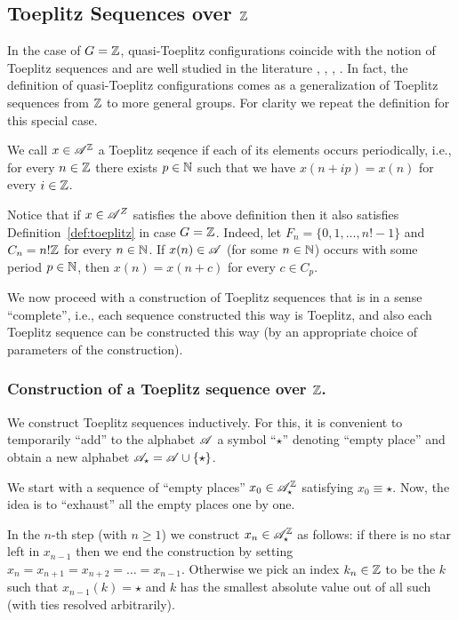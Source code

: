 \subsection{Toeplitz Sequences over $\mathbb{Z}$}
In the case of $G=\mathbb{Z}$, quasi-Toeplitz configurations coincide with the notion of Toeplitz sequences and are well studied in the literature \cite{JK69}, \cite{DI88}, \cite{AKL16}, \cite{Downarowicz05}.
%
In fact, the definition of quasi-Toeplitz configurations comes as a generalization of Toeplitz sequences from $\mathbb{Z}$ to more general groups.
%
For clarity we repeat the definition for this special case.
\begin{defn}
We call $x\in\mathscr{A}^{\mathbb{Z}}$ a Toeplitz seqence if each of its elements occurs periodically, i.e., for every $n\in\mathbb{Z}$ there exists $p\in\mathbb{N}$ such that we have $x(n+ip)=x(n)$  for every $i\in\mathbb{Z}$.
\end{defn}

\begin{rem}
Notice that if $x\in\mathscr{A}^Z$ satisfies the above definition then it also satisfies Definition~\ref{def:toeplitz} in case $G=\mathbb{Z}$. Indeed, let $F_n=\{0,1,\ldots,n!-1\}$ and $C_n=n!\mathbb{Z}$ for every $n\in\mathbb{N}$. If $x(n)\in\mathscr{A}$ (for some $n\in\mathbb{N}$) occurs with some period $p\in\mathbb{N}$, then $x(n)=x(n+c)$ for every $c\in C_p$.
\end{rem}
\noindent 
We now proceed  with a construction of Toeplitz sequences that is in a sense ``complete'', i.e., each sequence constructed this way is Toeplitz, and also each Toeplitz sequence can be constructed this way (by an appropriate choice of parameters of the construction).

\subsubsection{Construction of a Toeplitz sequence over $\mathbb{Z}$.}
We construct Toeplitz sequences inductively. For this, it is convenient to temporarily ``add'' to the alphabet $\mathscr{A}$ a symbol ``$\star$'' denoting ``empty place'' and obtain a new alphabet $\mathscr{A}_{\star}=\mathscr{A}\cup\{\star\}$.  

 We start with a sequence of ``empty places'' $x_0\in\mathscr{A}_{\star}^{\mathbb{Z}}$ satisfying $x_0\equiv \star$.
%
Now, the idea is to ``exhaust'' all the empty places one by one.

 In the $n$-th step (with $n\geq 1$) we construct $x_n\in\mathscr{A}_{\star}^{\mathbb{Z}}$ as follows: if there is no star left in $x_{n-1}$ then we end the construction by setting $x_n=x_{n+1}=x_{n+2}=\ldots = x_{n-1}$.
Otherwise we pick an index $k_n\in \mathbb{Z}$ to be the $k$ such that $x_{n-1}(k)=\star$ and $k$ has the smallest absolute value out of all such (with ties resolved arbitrarily).
%

